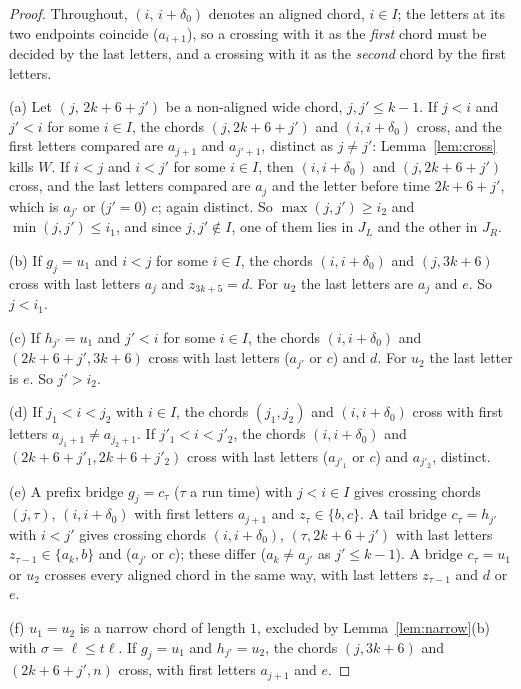 \documentclass[11pt]{article}
\theoremstyle{definition}
\begin{document}
\begin{proof}
Throughout, $(i,\,i+\delta_0)$ denotes an aligned chord, $i\in I$; the letters
at its two endpoints coincide ($a_{i+1}$), so a crossing with it as the
\emph{first} chord must be decided by the last letters, and a crossing with
it as the \emph{second} chord by the first letters.

(a) Let $(j,\,2k+6+j')$ be a non-aligned wide chord, $j,j'\le k-1$. If
$j<i$ and $j'<i$ for some $i\in I$, the chords $(j,2k+6+j')$ and
$(i,i+\delta_0)$ cross, and the first letters compared are $a_{j+1}$ and
$a_{j'+1}$, distinct as $j\ne j'$: Lemma~\ref{lem:cross} kills $W$. If $i<j$
and $i<j'$ for some $i\in I$, then $(i,i+\delta_0)$ and $(j,2k+6+j')$ cross,
and the last letters compared are $a_j$ and the letter before time
$2k+6+j'$, which is $a_{j'}$ or ($j'=0$) $c$; again distinct. So
$\max(j,j')\ge i_2$ and $\min(j,j')\le i_1$, and since $j,j'\notin I$, one of
them lies in $J_L$ and the other in $J_R$.

(b) If $g_j=u_1$ and $i<j$ for some $i\in I$, the chords $(i,i+\delta_0)$ and
$(j,3k+6)$ cross with last letters $a_j$ and $z_{3k+5}=d$. For $u_2$ the last
letters are $a_j$ and $e$. So $j<i_1$.

(c) If $h_{j'}=u_1$ and $j'<i$ for some $i\in I$, the chords $(i,i+\delta_0)$
and $(2k+6+j',3k+6)$ cross with last letters ($a_{j'}$ or $c$) and $d$. For
$u_2$ the last letter is $e$. So $j'>i_2$.

(d) If $j_1<i<j_2$ with $i\in I$, the chords $(j_1,j_2)$ and $(i,i+\delta_0)$
cross with first letters $a_{j_1+1}\ne a_{j_2+1}$. If $j'_1<i<j'_2$, the
chords $(i,i+\delta_0)$ and $(2k+6+j'_1,2k+6+j'_2)$ cross with last letters
($a_{j'_1}$ or $c$) and $a_{j'_2}$, distinct.

(e) A prefix bridge $g_j=c_\tau$ ($\tau$ a run time) with $j<i\in I$ gives
crossing chords $(j,\tau)$, $(i,i+\delta_0)$ with first letters $a_{j+1}$ and
$z_\tau\in\{b,c\}$. A tail bridge $c_\tau=h_{j'}$ with $i<j'$ gives crossing
chords $(i,i+\delta_0)$, $(\tau,2k+6+j')$ with last letters $z_{\tau-1}\in
\{a_k,b\}$ and ($a_{j'}$ or $c$); these differ ($a_k\ne a_{j'}$ as $j'\le
k-1$). A bridge $c_\tau=u_1$ or $u_2$ crosses every aligned chord in the
same way, with last letters $z_{\tau-1}$ and $d$ or $e$.

(f) $u_1=u_2$ is a narrow chord of length $1$, excluded by
Lemma~\ref{lem:narrow}(b) with $\sigma=\ell\le t\ell$. If $g_j=u_1$ and
$h_{j'}=u_2$, the chords $(j,3k+6)$ and $(2k+6+j',n)$ cross, with first letters
$a_{j+1}$ and $e$.
\end{proof}
\end{document}
